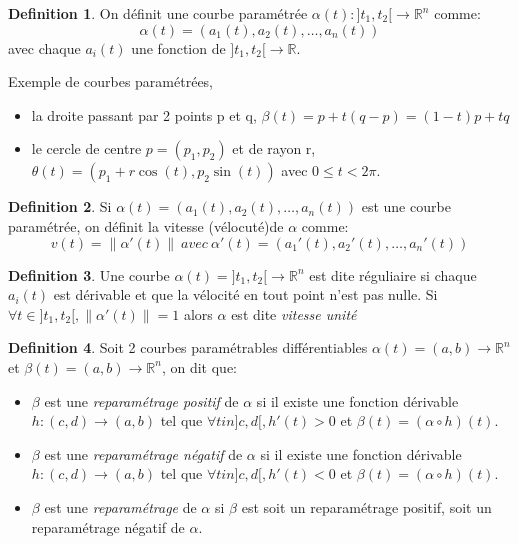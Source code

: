 \documentclass[]{book}
\theoremstyle{definition}
\newtheorem{defn}{Definition}
\newcommand{\bb}[1]{\mathbb{#1}}
\newcommand{\R}{\bb{R}}
\begin{document}
\begin{defn}
On d\'efinit une courbe param\'etr\'ee $\alpha(t): ]t_1,t_2[ \to \R^n$ comme:
$$\alpha(t) = (a_1(t), a_2(t), \ldots, a_n(t))$$
avec chaque $a_i(t)$ une fonction de $]t_1, t_2[ \to \R$. 
\end{defn}

Exemple de courbes param\'etr\'ees, 
\begin{itemize}
\item la droite passant par 2 points p et q, $\beta(t) = p +t(q-p) = (1-t)p + tq$
\item le cercle de centre $p = (p_1, p_2)$ et de rayon r, $\theta(t) = (p_1 + r\cos(t), p_2\sin(t))$ avec $0 \le t < 2\pi$.
\end{itemize}


\begin{defn}
Si $\alpha(t) = (a_1(t), a_2(t), \ldots, a_n(t))$ est une courbe param\'etr\'ee, on d\'efinit la vitesse (v\'elocut\'e)de $\alpha$  comme:
$$v(t) = \lVert \alpha'(t) \rVert \ avec \ \alpha'(t) = (a_1'(t), a_2'(t), \ldots, a_n'(t))$$
\end{defn}

\begin{defn}
Une courbe $\alpha(t) = ]t_1, t_2[ \to \R^n$ est dite r\'eguliaire si chaque $a_i(t)$ est d\'erivable et que la v\'elocit\'e en tout point n'est pas nulle. Si $\forall t \in ]t_1, t_2[, \lVert \alpha'(t) \rVert = 1$ alors $\alpha$ est dite \emph{vitesse unit\'e}
\end{defn}


\begin{defn}
Soit 2 courbes param\'etrables diff\'erentiables $\alpha(t) = (a,b) \to \R^n$ et $\beta(t) = (a,b) \to \R^n$, on dit que:
\begin{itemize}
\item $\beta$ est une \emph{reparam\'etrage positif} de $\alpha$ si il existe une fonction d\'erivable $h: (c,d) \to (a,b)$ tel que $\forall t in ]c,d[, h'(t) > 0$ et $\beta(t) = (\alpha \circ h)(t)$. 
\item $\beta$ est une \emph{reparam\'etrage n\'egatif} de $\alpha$ si il existe une fonction d\'erivable $h: (c,d) \to (a,b)$ tel que $\forall t in ]c,d[, h'(t) < 0$ et $\beta(t) = (\alpha \circ h)(t)$. 
\item $\beta$ est une \emph{reparam\'etrage} de $\alpha$ si $\beta$ est soit un reparam\'etrage positif, soit un reparam\'etrage n\'egatif de $\alpha$. 
\end{itemize}
\end{defn}
\end{document}
